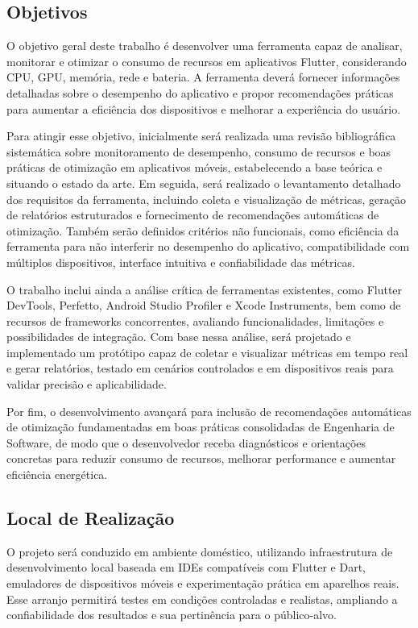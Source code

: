 \documentclass[12pt,a4paper]{article}
\begin{document}
\subsection{Objetivos}
O objetivo geral deste trabalho é desenvolver uma ferramenta capaz de analisar, monitorar e otimizar o consumo de recursos em aplicativos Flutter, considerando CPU, GPU, memória, rede e bateria. A ferramenta deverá fornecer informações detalhadas sobre o desempenho do aplicativo e propor recomendações práticas para aumentar a eficiência dos dispositivos e melhorar a experiência do usuário.

Para atingir esse objetivo, inicialmente será realizada uma revisão bibliográfica sistemática sobre monitoramento de desempenho, consumo de recursos e boas práticas de otimização em aplicativos móveis, estabelecendo a base teórica e situando o estado da arte. Em seguida, será realizado o levantamento detalhado dos requisitos da ferramenta, incluindo coleta e visualização de métricas, geração de relatórios estruturados e fornecimento de recomendações automáticas de otimização. Também serão definidos critérios não funcionais, como eficiência da ferramenta para não interferir no desempenho do aplicativo, compatibilidade com múltiplos dispositivos, interface intuitiva e confiabilidade das métricas.

O trabalho inclui ainda a análise crítica de ferramentas existentes, como Flutter DevTools, Perfetto, Android Studio Profiler e Xcode Instruments, bem como de recursos de frameworks concorrentes, avaliando funcionalidades, limitações e possibilidades de integração. Com base nessa análise, será projetado e implementado um protótipo capaz de coletar e visualizar métricas em tempo real e gerar relatórios, testado em cenários controlados e em dispositivos reais para validar precisão e aplicabilidade.

Por fim, o desenvolvimento avançará para inclusão de recomendações automáticas de otimização fundamentadas em boas práticas consolidadas de Engenharia de Software, de modo que o desenvolvedor receba diagnósticos e orientações concretas para reduzir consumo de recursos, melhorar performance e aumentar eficiência energética.

\subsection{Local de Realização}
O projeto será conduzido em ambiente doméstico, utilizando infraestrutura de desenvolvimento local baseada em IDEs compatíveis com Flutter e Dart, emuladores de dispositivos móveis e experimentação prática em aparelhos reais. Esse arranjo permitirá testes em condições controladas e realistas, ampliando a confiabilidade dos resultados e sua pertinência para o público-alvo.
\end{document}
